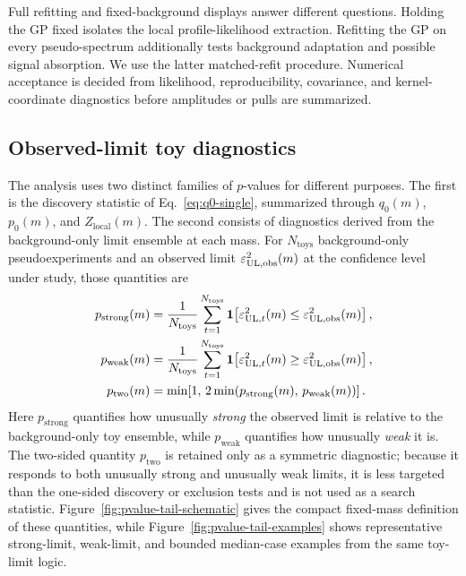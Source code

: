 Full refitting and fixed-background displays answer different questions. Holding the GP
fixed isolates the local profile-likelihood extraction.  Refitting the GP on every
pseudo-spectrum additionally tests background adaptation and possible signal
absorption. We use the latter matched-refit procedure. Numerical acceptance is decided
from likelihood, reproducibility, covariance, and kernel-coordinate diagnostics before
amplitudes or pulls are summarized.

\subsection{Observed-limit toy diagnostics}

The analysis uses two distinct families of $p$-values for different purposes. The
first is the discovery statistic of
Eq.~\eqref{eq:q0-single}, summarized through $q_0(m)$, $p_0(m)$, and
$Z_{\mathrm{local}}(m)$. The second consists of diagnostics
derived from the background-only \CLs{} limit ensemble at each mass. For
$N_{\mathrm{toys}}$ background-only pseudoexperiments and an observed limit
$\varepsilon^2_{\mathrm{UL},\mathrm{obs}}(m)$ at the confidence level under study, those
quantities are
\begin{align}
p_{\mathrm{strong}}(m)
&=
\frac{1}{N_{\mathrm{toys}}}
\sum_{t=1}^{N_{\mathrm{toys}}}
\mathbf{1}\!\left[
\varepsilon^2_{\mathrm{UL},t}(m)\le \varepsilon^2_{\mathrm{UL},\mathrm{obs}}(m)
\right], \\
p_{\mathrm{weak}}(m)
&=
\frac{1}{N_{\mathrm{toys}}}
\sum_{t=1}^{N_{\mathrm{toys}}}
\mathbf{1}\!\left[
\varepsilon^2_{\mathrm{UL},t}(m)\ge \varepsilon^2_{\mathrm{UL},\mathrm{obs}}(m)
\right], \\
p_{\mathrm{two}}(m)
&=
\min\!\left[1,\,
2\min\!\left(p_{\mathrm{strong}}(m),\,p_{\mathrm{weak}}(m)\right)\right].
\end{align}
Here $p_{\mathrm{strong}}$ quantifies how unusually \emph{strong} the observed limit
is relative to the background-only toy ensemble, while $p_{\mathrm{weak}}$ quantifies
how unusually \emph{weak} it is. The two-sided quantity $p_{\mathrm{two}}$ is retained
only as a symmetric diagnostic; because it responds to both unusually strong
and unusually weak limits, it is less targeted than the one-sided discovery or
exclusion tests and is not used as a search statistic. Figure~\ref{fig:pvalue-tail-schematic}
gives the compact fixed-mass definition of these quantities, while
Figure~\ref{fig:pvalue-tail-examples} shows representative strong-limit, weak-limit,
and bounded median-case examples from the same toy-limit logic.

